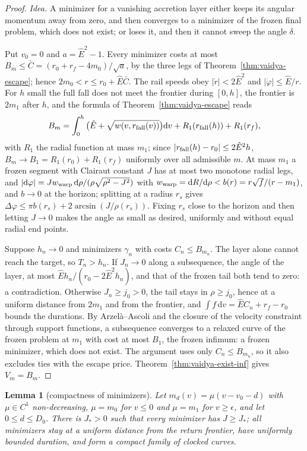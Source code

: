 \documentclass[aip,jmp,amsmath,amssymb,reprint]{revtex4-2}
\newcommand{\Ehat}{\hat E}
\newcommand{\dd}{\mathrm{d}}
\theoremstyle{plain}
\newtheorem{lemma}[proposition]{Lemma}
\theoremstyle{definition}
\begin{document}
\begin{proof}
\emph{Idea.} A minimizer for a vanishing accretion layer either keeps its angular momentum away from zero,
and then converges to a minimizer of the frozen final problem, which does not exist; or loses it, and then
it cannot sweep the angle $\delta$.

Put $v_0=0$ and $a=\Ehat^2-1$. Every minimizer costs at most $B_m\le\bar C=(r_0+r_f-4m_0)/\sqrt a$, by the three
legs of Theorem~\ref{thm:vaidya-escape}; hence $2m_0<r\le r_0+\Ehat\bar C$. The rail speeds obey $|\dot r|<2\Ehat^2$
and $|\dot\varphi|\le\Ehat/r$. For $h$ small the full fall does not meet the frontier during $[0,h]$, the
frontier is $2m_1$ after $h$, and the formula of Theorem~\ref{thm:vaidya-escape} reads
\[
  B_m=\int_0^h\big(\Ehat+\sqrt{w(v,r_{\rm fall}(v))}\big)\dd v+R_1(r_{\rm fall}(h))+R_1(r_f),
\]
with $R_1$ the radial function at mass $m_1$; since $|r_{\rm fall}(h)-r_0|\le2\Ehat^2h$, $B_m\to B_1=R_1(r_0)+R_1(r_f)$
uniformly over all admissible $m$. At mass $m_1$ a frozen segment with Clairaut constant $J$ has at most two monotone radial legs, and
$|\dd\varphi|=Jw_{\rm warp}\,\dd\rho/(\rho\sqrt{\rho^2-J^2})$ with $w_{\rm warp}=\dd R/\dd\rho<b(r)=r\sqrt f/(r-m_1)$,
and $b\to0$ at the horizon; splitting at a radius $r_s$ gives $\Delta\varphi\le\pi b(r_s)+2\arcsin(J/\rho(r_s))$. Fixing $r_s$
close to the horizon and then letting $J\to0$ makes the angle as small as desired, uniformly and without
equal radial end points.

Suppose $h_n\to0$ and minimizers $\gamma_n$ with costs $C_n\le B_{m_n}$. The layer alone cannot reach the target,
so $T_n>h_n$. If $J_n\to0$ along a subsequence, the angle of the layer, at most $\Ehat h_n/(r_0-2\Ehat^2h_n)$, and
that of the frozen tail both tend to zero: a contradiction. Otherwise $J_n\ge j_0>0$, the tail stays in
$\rho\ge j_0$, hence at a uniform distance from $2m_1$ and from the frontier, and
$\int f\,\dd v=\Ehat C_n+r_f-r_0$ bounds the durations. By Arzel\`a--Ascoli and the closure of the
velocity constraint through support functions, a subsequence converges to a relaxed curve of the
frozen problem at $m_1$ with cost at most $B_1$, the frozen infimum: a frozen minimizer, which does not
exist. The argument uses only $C_n\le B_{m_n}$, so it also excludes ties with the escape price.
Theorem~\ref{thm:vaidya-exist-inf} gives $V_m=B_m$.
\end{proof}

\begin{lemma}[compactness of minimizers]\label{lem:vaidya-compact}
Let $m_d(v)=\mu(v-v_0-d)$ with $\mu\in C^1$ non-decreasing, $\mu=m_0$ for $v\le0$ and $\mu=m_1$ for $v\ge\epsilon$, and
let $0\le d\le D_0$. There is $J_*>0$ such that every minimizer has $J\ge J_*$; all minimizers stay at a uniform
distance from the return frontier, have uniformly bounded duration, and form a compact family of clocked
curves.
\end{lemma}
\end{document}

